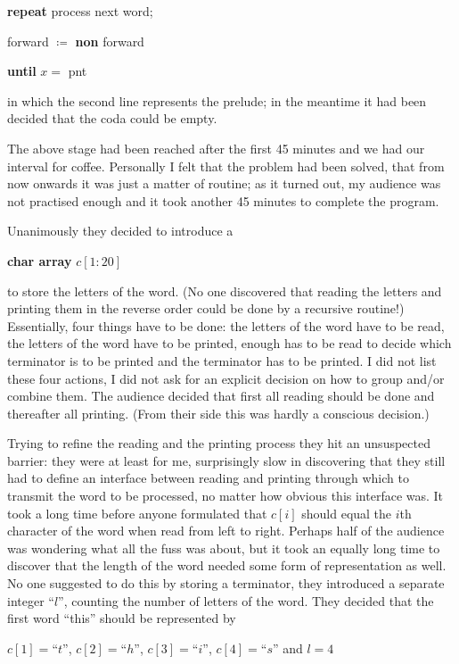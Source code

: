 \quad \textbf{repeat} process next word;

\quad \quad forward $\coloneq$ \textbf{non} forward

\quad \textbf{until} $x =$ pnt

\noindent
in which the second line represents the prelude; in the meantime it had been decided that the coda could be empty.

The above stage had been reached after the first 45 minutes and we had our interval for coffee. Personally I felt that the problem had been solved, that from now onwards it was just a matter of routine; as it turned out, my audience was not practised enough and it took another 45 minutes to complete the program.

Unanimously they decided to introduce a

\quad \textbf{char array} $c[1:20]$

\noindent
to store the letters of the word. (No one discovered that reading the letters and printing them in the reverse order could be done by a recursive routine!) Essentially, four things have to be done: the letters of the word have to be read, the letters of the word have to be printed, enough has to be read to decide which terminator is to be printed and the terminator has to be printed. I did not list these four actions, I did not ask for an explicit decision on how to group and/or combine them. The audience decided that first all reading should be done and thereafter all printing. (From their side this was hardly a conscious decision.)

Trying to refine the reading and the printing process they hit an unsuspected barrier: they were \textemdash{}  at least for me, surprisingly \textemdash{}  slow in discovering that they still had to define an interface between reading and printing through which to transmit the word to be processed, no matter how obvious this interface was. It took a long time before anyone formulated that $c[i]$ should equal the $i$th character of the word when read from left to right. Perhaps half of the audience was wondering what all the fuss was about, but it took an equally long time to discover that the length of the word needed some form of representation as well. No one suggested to do this by storing a terminator, they introduced a separate integer ``$l$'', counting the number of letters of the word. They decided that the first word ``this'' should be represented by

\quad $c[1] = $``$t$'', $c[2] = $``$h$'', $c[3] = $``$i$'', $c[4] = $``$s$'' and $l = 4$

